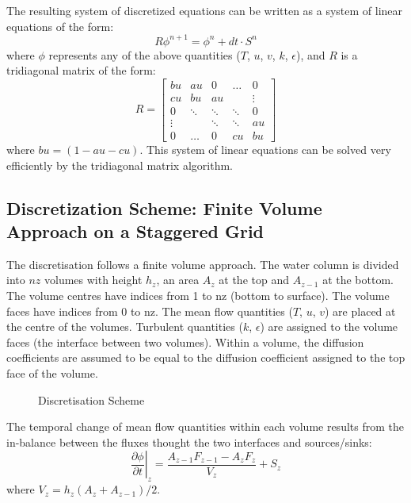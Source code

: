 \documentclass[paper=a4, fontsize=12pt]{article}
\begin{document}
\noindent The resulting system of discretized equations can be written as a system of linear equations of the form:
\begin{equation}
	R\phi^{n+1}=\phi^n+dt\cdot S^{n}
\end{equation}
where $\phi$ represents any of the above quantities ($T$, $u$, $v$, $k$, $\epsilon$), and $R$ is a tridiagonal matrix of the form:
\begin{equation}
	R=\begin{bmatrix}
	bu		&	au		&	0		&	\hdots	&	0  \\
	cu		&	bu		&	au		&	 		&	\vdots \\
	0		&	\ddots	&	\ddots	&	\ddots	&	0 \\
	\vdots	&			&	\ddots	&	\ddots	&	au \\
	0		&	\hdots	&	0		&	cu		&	bu
	\end{bmatrix}
\end{equation}
where $bu=(1-au-cu)$. This system of linear equations can be solved very efficiently by the tridiagonal matrix algorithm.

\subsection{Discretization Scheme: Finite Volume Approach on a Staggered Grid}
The discretisation follows a finite volume approach. The water column is divided into $nz$ volumes with height $h_z$, an area $A_z$ at the top and $A_{z-1}$ at the bottom. The volume centres have indices from 1 to nz (bottom to surface). The volume faces have indices from 0 to nz. The mean flow quantities ($T$, $u$, $v$) are placed at the centre of the volumes. Turbulent quantities ($k$, $\epsilon$) are assigned to the volume faces (the interface between two volumes). Within a volume, the diffusion coefficients are assumed to be equal to the diffusion coefficient assigned to the top face of the volume.

\begin{figure}[h!]
	\centering
	\def\svgwidth{\textwidth}
	
	\caption{Discretisation Scheme}
\end{figure}

The temporal change of mean flow quantities within each volume results from the in-balance between the fluxes thought the two interfaces and sources/sinks:
\begin{equation}
	\left.\frac{\partial\phi}{\partial t}\right|_{z} = \frac{A_{z-1}F_{z-1}-A_zF_z}{V_z}+S_z
\end{equation}
where $V_z=h_z\left(A_z+A_{z-1}\right)/2$.
\end{document}
